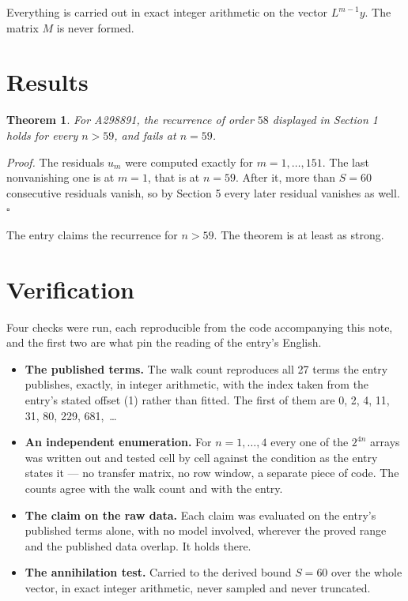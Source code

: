 \documentclass[11pt]{article}
\newtheorem{theorem}{Theorem}
\theoremstyle{definition}
\begin{document}
Everything is carried out in exact integer arithmetic on the vector $L^{m-1}y$. The matrix $M$ is never formed.

\section{Results}

\begin{theorem} For A298891, the recurrence of order $58$ displayed in Section 1 holds for every $n > 59$, and fails at $n = 59$.\end{theorem}

{\itshape Proof.} The residuals $u_m$ were computed exactly for $m = 1,\dots,151$. The last nonvanishing one is at $m = 1$, that is at $n = 59$. After it, more than $S = 60$ consecutive residuals vanish, so by Section 5 every later residual vanishes as well. $\square$

The entry claims the recurrence for $n > 59$. The theorem is at least as strong.

\section{Verification}

Four checks were run, each reproducible from the code accompanying this note, and the first two are what pin the reading of the entry's English.

\begin{itemize}

\item {\bfseries The published terms.} The walk count reproduces all 27 terms the entry publishes, exactly, in integer arithmetic, with the index taken from the entry's stated offset (1) rather than fitted. The first of them are 0, 2, 4, 11, 31, 80, 229, 681,~\dots

\item {\bfseries An independent enumeration.} For $n = 1,\dots,4$ every one of the $2^{4n}$ arrays was written out and tested cell by cell against the condition as the entry states it --- no transfer matrix, no row window, a separate piece of code. The counts agree with the walk count and with the entry.

\item {\bfseries The claim on the raw data.} Each claim was evaluated on the entry's published terms alone, with no model involved, wherever the proved range and the published data overlap. It holds there.

\item {\bfseries The annihilation test.} Carried to the derived bound $S = 60$ over the whole vector, in exact integer arithmetic, never sampled and never truncated.

\end{itemize}
\end{document}
